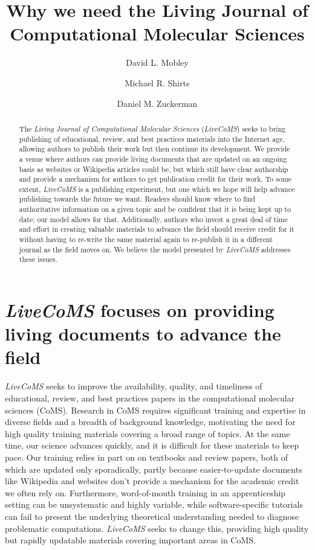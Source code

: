 \documentclass[9pt]{livecoms}
\title{Why we need the Living Journal of Computational Molecular Sciences}
\author[1*]{David L. Mobley}
\author[2*]{Michael R. Shirts}
\author[3*]{Daniel M. Zuckerman}
\affil[1]{Department of Pharmaceutical Sciences and Chemistry, University of California, Irvine}
\affil[2]{Department of Chemical and Biological Engineering, University of Colorado Boulder}
\affil[2]{Department of Biomedical Engineering, Oregon Health Sciences University}
\begin{document}
\maketitle

\begin{abstract}
The \emph{Living Journal of Computational Molecular Sciences} (\emph{LiveCoMS}) seeks to bring publishing of educational, review, and best practices materials into the Internet age, allowing authors to publish their work but then continue its development.
We provide a venue where authors can provide living documents that are updated on an ongoing basis as websites or Wikipedia articles could be, but which still have clear authorship and provide a mechanism for authors to get publication credit for their work.
To some extent, \emph{LiveCoMS} is a publishing experiment, but one which we hope will help advance publishing towards the future we want.
Readers should know where to find authoritative information on a given topic and be confident that it is being kept up to date; our model allows for that. 
Additionally, authors who invest a great deal of time and effort in creating valuable materials to advance the field should receive credit for it without having to re-write the same material again to re-publish it in a different journal as the field moves on. 
We believe the model presented by \emph{LiveCoMS} addresses these issues.
\end{abstract}


\section{\emph{LiveCoMS} focuses on providing living documents to advance the field}

\emph{LiveCoMS} seeks to improve the availability, quality, and timeliness of educational, review, and best practices papers in the computational molecular sciences (CoMS).
Research in CoMS requires significant training and expertise in diverse fields and a breadth of background knowledge, motivating the need for high quality training materials covering a broad range of topics.
At the same time, our science advances quickly, and it is difficult for these materials to keep pace. 
Our training relies in part on on textbooks and review papers, both of which are updated only sporadically, partly because easier-to-update documents like Wikipedia and websites don't provide a mechanism for the academic credit we often rely on.
Furthermore, word-of-mouth training in an apprenticeship setting can be unsystematic and highly variable, while software-specific tutorials can fail to present the underlying theoretical understanding needed to diagnose problematic computations.
\emph{LiveCoMS} seeks to change this, providing high quality but rapidly updatable materials covering important areas in CoMS.
\end{document}
